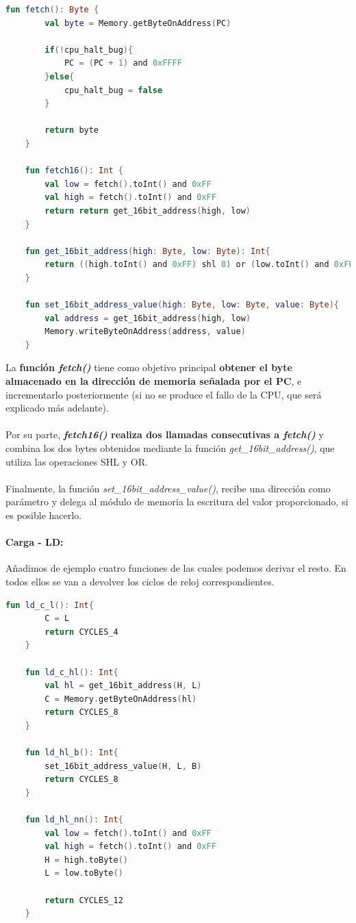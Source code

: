 \begin{lstlisting}[language=Kotlin, caption={Operaciones comunes}, label={code:kotlincommon}]
    fun fetch(): Byte {
        val byte = Memory.getByteOnAddress(PC)

        if(!cpu_halt_bug){
            PC = (PC + 1) and 0xFFFF
        }else{
            cpu_halt_bug = false
        }

        return byte
    }

    fun fetch16(): Int {
        val low = fetch().toInt() and 0xFF
        val high = fetch().toInt() and 0xFF
        return return get_16bit_address(high, low)
    }

    fun get_16bit_address(high: Byte, low: Byte): Int{
        return ((high.toInt() and 0xFF) shl 8) or (low.toInt() and 0xFF)
    }

    fun set_16bit_address_value(high: Byte, low: Byte, value: Byte){
        val address = get_16bit_address(high, low)
        Memory.writeByteOnAddress(address, value)
    }
\end{lstlisting}

La \textbf{función \textit{fetch()}} tiene como objetivo principal \textbf{obtener el byte almacenado en la dirección de memoria señalada por el PC}, e incrementarlo posteriormente (si no se produce el fallo de la CPU, que será explicado más adelante). 
\\\\
Por su parte, \textbf{\textit{fetch16()} realiza dos llamadas consecutivas a \textit{fetch()}} y combina los dos bytes obtenidos mediante la función \textit{get\_16bit\_address()}, que utiliza las operaciones SHL y OR. 
\\\\
Finalmente, la función \textit{set\_16bit\_address\_value()}, recibe una dirección como parámetro y delega al módulo de memoria la escritura del valor proporcionado, si es posible hacerlo.

\paragraph{Carga - LD:}\label{instrLd}

Añadimos de ejemplo cuatro funciones de las cuales podemos derivar el resto. En todos ellos se van a devolver los ciclos de reloj correspondientes.

\begin{lstlisting}[language=Kotlin, caption={Operaciones LD}, label={code:kotlinld}]
    fun ld_c_l(): Int{
        C = L
        return CYCLES_4
    }

    fun ld_c_hl(): Int{
        val hl = get_16bit_address(H, L)
        C = Memory.getByteOnAddress(hl)
        return CYCLES_8
    }

    fun ld_hl_b(): Int{
        set_16bit_address_value(H, L, B)
        return CYCLES_8
    }

    fun ld_hl_nn(): Int{
        val low = fetch().toInt() and 0xFF
        val high = fetch().toInt() and 0xFF
        H = high.toByte()
        L = low.toByte()

        return CYCLES_12
    }
\end{lstlisting}

